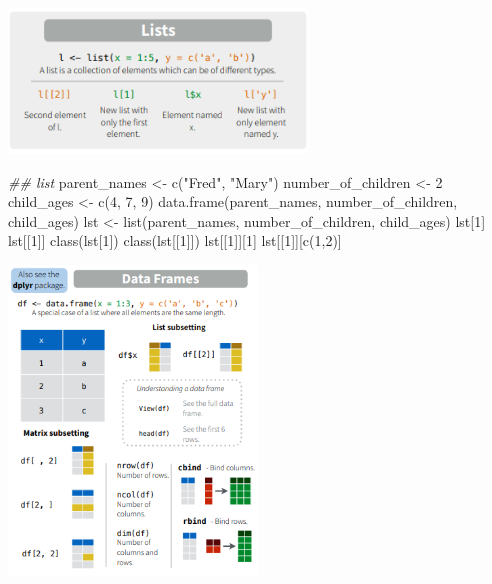 \documentclass[
  a4paper,
]{book}
\newenvironment{Shaded}{\begin{snugshade}}{\end{snugshade}}
\newcommand{\DecValTok}[1]{\textcolor[rgb]{0.68,0.00,0.00}{#1}}
\newcommand{\DocumentationTok}[1]{\textcolor[rgb]{0.37,0.37,0.37}{\textit{#1}}}
\newcommand{\FunctionTok}[1]{\textcolor[rgb]{0.28,0.35,0.67}{#1}}
\newcommand{\NormalTok}[1]{\textcolor[rgb]{0.00,0.23,0.31}{#1}}
\newcommand{\OtherTok}[1]{\textcolor[rgb]{0.00,0.23,0.31}{#1}}
\newcommand{\StringTok}[1]{\textcolor[rgb]{0.13,0.47,0.30}{#1}}
\begin{document}
\includegraphics[width=3.125in,height=\textheight]{images/03/05.PNG}

\begin{Shaded}
\begin{Highlighting}[]
\DocumentationTok{\#\# list}
\NormalTok{parent\_names }\OtherTok{\textless{}{-}} \FunctionTok{c}\NormalTok{(}\StringTok{"Fred"}\NormalTok{, }\StringTok{"Mary"}\NormalTok{)}
\NormalTok{number\_of\_children }\OtherTok{\textless{}{-}} \DecValTok{2}
\NormalTok{child\_ages }\OtherTok{\textless{}{-}} \FunctionTok{c}\NormalTok{(}\DecValTok{4}\NormalTok{, }\DecValTok{7}\NormalTok{, }\DecValTok{9}\NormalTok{)}
\FunctionTok{data.frame}\NormalTok{(parent\_names, number\_of\_children, child\_ages)}
\NormalTok{lst }\OtherTok{\textless{}{-}} \FunctionTok{list}\NormalTok{(parent\_names, number\_of\_children, child\_ages)}
\NormalTok{lst[}\DecValTok{1}\NormalTok{]}
\NormalTok{lst[[}\DecValTok{1}\NormalTok{]]}
\FunctionTok{class}\NormalTok{(lst[}\DecValTok{1}\NormalTok{])}
\FunctionTok{class}\NormalTok{(lst[[}\DecValTok{1}\NormalTok{]])}
\NormalTok{lst[[}\DecValTok{1}\NormalTok{]][}\DecValTok{1}\NormalTok{]}
\NormalTok{lst[[}\DecValTok{1}\NormalTok{]][}\FunctionTok{c}\NormalTok{(}\DecValTok{1}\NormalTok{,}\DecValTok{2}\NormalTok{)]}
\end{Highlighting}
\end{Shaded}

\includegraphics[width=2.60417in,height=\textheight]{images/03/06.PNG}
\end{document}
